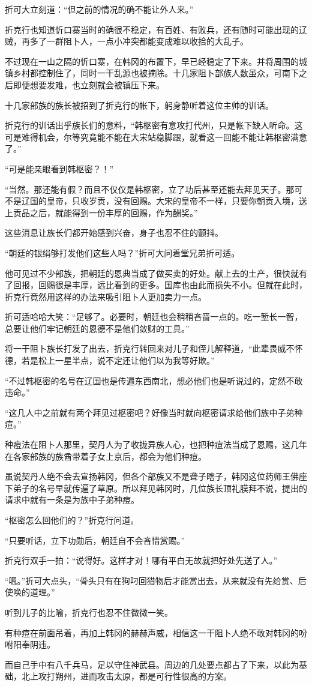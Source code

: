 折可大立刻道：“但之前的情况的确不能让外人来。”

折克行也知道忻口寨当时的确很不稳定，有百姓、有败兵，还有随时可能出现的辽贼，再多了一群阻卜人，一点小冲突都能变成难以收拾的大乱子。

不过现在一山之隔的忻口寨，在韩冈的布置下，早已经稳定了下来。并将周围的城镇乡村都控制住了，同时一干乱源也被摘除。十几家阻卜部族人数虽众，可南下之后即便想要发难，也立刻就会被镇压下来。

十几家部族的族长被招到了折克行的帐下，躬身静听着这位主帅的训话。

折克行的训话出乎族长们的意料，“韩枢密有意攻打代州，只是帐下缺人听命。这可是难得机会，尔等究竟能不能在大宋站稳脚跟，就看这一回能不能让韩枢密满意了。”

“可是能亲眼看到韩枢密？！”

“当然。那还能有假？而且不仅仅是韩枢密，立了功后甚至还能去拜见天子。那可不是辽国的皇帝，只收岁贡，没有回赐。大宋的皇帝不一样，只要你朝贡入境，送上贡品之后，就能得到一份丰厚的回赐，作为酬奖。”

这些消息让族长们都开始感到兴奋，身子也忍不住的颤抖。

“朝廷的银绢够打发他们这些人吗？”折可大问着堂兄弟折可适。

他可见过不少部族，把朝廷的恩典当成了做买卖的好处。献上去的土产，很快就有了回报，回赐很是丰厚，远比看到的更多。国库也由此而损失不小。但就在此时，折克行竟然用这样的办法来吸引阻卜人更加卖力一点。

折可适哈哈大笑：“足够了。必要时，朝廷也会稍稍吝啬一点的。吃一堑长一智，总要让他们牢记朝廷的恩德不是他们敛财的工具。”

将一干阻卜族长打发了出去，折克行转回来对儿子和侄儿解释道，“此辈畏威不怀德，若是松上一星半点，说不定还让他们以为我等好欺。”

“不过韩枢密的名号在辽国也是传遍东西南北，想必他们也是听说过的，定然不敢违命。”

“这几人中之前就有两个拜见过枢密吧？好像当时就向枢密请求给他们族中子弟种痘。”

种痘法在阻卜人那里，契丹人为了收拢异族人心，也把种痘法当成了恩赐，这几年在各家部族的族酋带着子女上京后，都会为他们种痘。

虽说契丹人绝不会去宣扬韩冈，但各个部族又不是聋子瞎子，韩冈这位药师王佛座下弟子的名号早就传遍了草原。所以拜见韩冈时，几位族长顶礼膜拜不说，提出的请求中就有一条是为族中子弟种痘。

“枢密怎么回他们的？”折克行问道。

“只要听话，立下功勋后，朝廷自不会吝惜赏赐。”

折克行双手一拍：“说得好。这样才对！哪有平白无故就把好处先送了人。”

“嗯。”折可大点头，“骨头只有在狗叼回猎物后才能赏出去，从来就没有先给赏、后使唤的道理。”

听到儿子的比喻，折克行也忍不住微微一笑。

有种痘在前面吊着，再加上韩冈的赫赫声威，相信这一干阻卜人绝不敢对韩冈的吩咐阳奉阴违。

而自己手中有八千兵马，足以守住神武县。周边的几处要点都占了下来，以此为基础，北上攻打朔州，进而攻击太原，都是可行性很高的方案。
